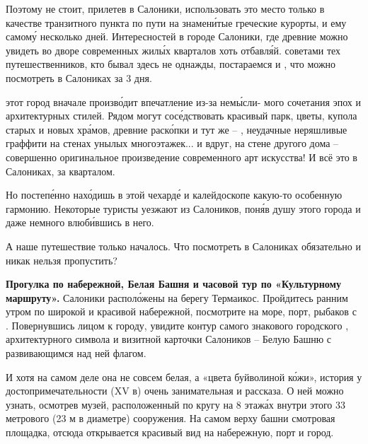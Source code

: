 Поэтому не стоит, прилетев в Салоники, использовать это место только в качестве транзитного пункта по пути на знамен\'{и}тые греческие курорты,  и ему самом\'{у} несколько дней. Интересностей в городе Салоники, где древние  можно увидеть во дворе современных жил\'{ы}х кварталов хоть отбавл\'{я}й.  советами тех путешественников, кто бывал здесь не однажды, постараемся  и , что можно посмотреть в Салониках за 3 дня.

 этот город вначале произв\'{о}дит  впечатление из-за нем\'{ы}сли- мого сочетания эпох и архитектурных стилей. Рядом могут сос\'{е}дствовать красивый парк, цветы, купола старых и новых хр\'{а}мов, древние раск\'{о}пки и тут же --  , неудачные неряшливые граффити на стенах унылых многоэтажек... и вдруг, на стене другого дома -- совершенно оригинальное произведение современного арт искусства! И всё это  в Салониках,  за кварталом.

Но постеп\'{е}нно нах\'{о}дишь в этой чехард\'{е} и калейдоскопе какую-то особенную гармонию. Некоторые туристы уезжают из Салоников, пон\'{я}в душу этого города и даже немного влюб\'{и}вшись в него.

А наше путешествие только началось. Что посмотреть в Салониках обязательно и никак нельзя пропустить?

\textbf{Прогулка по набережной, Белая Башня и часовой тур по «Культурному маршруту».}
Салоники распол\'{о}жены на берегу  Термаикос. Пройдитесь ранним утром по широкой и красивой набережной, посмотрите на море, порт, рыбаков с . Повернувшись лицом к городу, увидите контур самого знакового городского , архитектурного символа и визитной карточки Салоников -- Белую Башню с развивающимся над ней флагом.

И хотя на самом деле она не совсем белая, а «цвета буйволиной к\'{о}жи», история у достопримечательности (XV в) очень занимательная и   рассказа. О ней можно узнать, осмотрев музей, расположенный по кругу на 8 этаж\'{а}х внутри этого 33 метрового (23 м в диаметре)  сооружения. На самом верху башни смотровая площадка, отсюда открывается красивый вид на набережную, порт и город.

